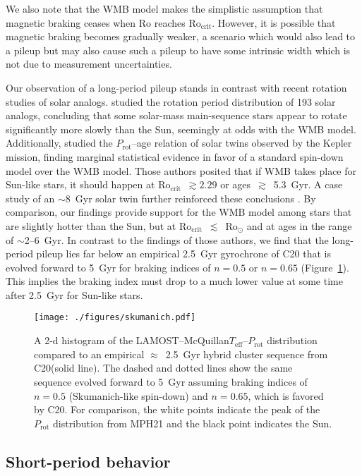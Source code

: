 \documentclass[trackchanges,twocolumn]{aastex631}
\newcommand{\rocrit}{$\mathrm{Ro_{crit}}$\xspace}
\newcommand{\rosun}{$\mathrm{Ro_{\odot}}$\xspace}
\newcommand{\lamostmcq}{LAMOST--McQuillan\xspace}
\newcommand{\masuda}{MPH21\xspace}
\newcommand{\curtis}{C20\xspace}
\newcommand{\teff}{\ensuremath{T_{\mathrm{eff}}}\xspace}
\newcommand{\prot}{\ensuremath{P_\mathrm{rot}}\xspace}
\begin{document}
We also note that the WMB model makes the simplistic assumption that magnetic braking ceases when Ro reaches \rocrit. However, it is possible that magnetic braking becomes gradually weaker, a scenario which would also lead to a pileup but may also cause such a pileup to have some intrinsic width which is not due to measurement uncertainties.

Our observation of a long-period pileup stands in contrast with recent rotation studies of solar analogs. \citet{doNascimento2020} studied the rotation period distribution of 193 solar analogs, concluding that some solar-mass main-sequence stars appear to rotate significantly more slowly than the Sun, seemingly at odds with the WMB model. Additionally, \citet{LorenzoOliveira2019} studied the \prot--age relation of solar twins observed by the Kepler mission, finding marginal statistical evidence in favor of a standard spin-down model over the WMB model. Those authors posited that if WMB takes place for Sun-like stars, it should happen at \rocrit~$\gtrsim 2.29$ or ages~$\gtrsim$~5.3~Gyr. A case study of an $\sim$8~Gyr solar twin further reinforced these conclusions \citep{LorenzoOliveira2020}.  By comparison, our findings provide support for the WMB model among stars that are slightly hotter than the Sun, but at \rocrit~$\lesssim$~\rosun and at ages in the range of $\sim$2--6~Gyr. In contrast to the findings of those authors, we find that the long-period pileup lies far below an empirical 2.5~Gyr gyrochrone of \curtis that is evolved forward to 5~Gyr for braking indices of $n=0.5$ or $n=0.65$ (Figure~\ref{fig:skumanich}). This implies the braking index must drop to a much lower value at some time after 2.5~Gyr for Sun-like stars.

\begin{figure}
    \centering
    \texttt{[image: ./figures/skumanich.pdf]}
    \caption{A 2-d histogram of the \lamostmcq \teff–\prot distribution compared to an empirical $\approx$~2.5~Gyr hybrid cluster sequence from \curtis (solid line). The dashed and dotted lines show the same sequence evolved forward to 5~Gyr assuming braking indices of $n=0.5$ (Skumanich-like spin-down) and $n=0.65$, which is favored by \curtis. For comparison, the white points indicate the peak of the \prot distribution from \masuda and the black point indicates the Sun.}
    \label{fig:skumanich}
\end{figure}

\hfill\break
\subsection{Short-period behavior} \label{subsec:shortperiod}
\end{document}
